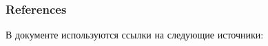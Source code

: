 \subsubsection{References}

В документе используются ссылки на следующие источники:

\printbibliography[heading=none]